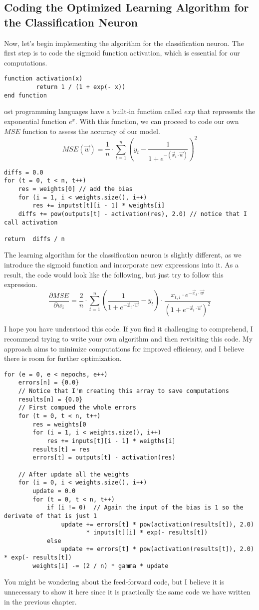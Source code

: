 \subsection{Coding the Optimized Learning Algorithm for the Classification Neuron}
Now, let's begin implementing the algorithm for the classification neuron. The first step is to code
the sigmoid function activation, which is essential for our computations.
\begin{verbatim}
function activation(x)
         return 1 / (1 + exp(- x))
end function
\end{verbatim}
ost programming languages have a built-in function called $exp$ that represents the exponential function $e^x$.
With this function, we can proceed to code our own $MSE$ function to assess the accuracy of our model.
\[
MSE(\vec{w}) = \frac{1}{n} \cdot \sum_{t = 1}^{n}(y_t - \frac{1}{1 + e^{-(\vec{x}_t \cdot \vec{w})}})^2
\]
\begin{verbatim}
diffs = 0.0
for (t = 0, t < n, t++)
    res = weights[0] // add the bias
    for (i = 1, i < weights.size(), i++)
        res += inputst[t][i - 1] * weights[i]
    diffs += pow(outputs[t] - activation(res), 2.0) // notice that I call activation

return  diffs / n
\end{verbatim}
The learning algorithm for the classification neuron is slightly different, as we introduce the sigmoid
function and incorporate new expressions into it. As a result, the code would look like the following,
but just try to follow this expression.
\[
\frac{\partial MSE}{\partial w_i} = \frac{2}{n} \cdot \sum_{t = 1}^n
(\frac{1}{1 + e^{-\vec{x}_t \cdot \vec{w}}} - y_t) \cdot
\frac{x_{t, i} \cdot e^{- \vec{x}_t \cdot \vec{w}}}{(1 + e^{- \vec{x}_t \cdot \vec{w}})^2}
\]

I hope you have understood this code. If you find it challenging to comprehend, I recommend trying to write
your own algorithm and then revisiting this code. My approach aims to minimize computations for improved
efficiency, and I believe there is room for further optimization.
\begin{verbatim}
for (e = 0, e < nepochs, e++)
    errors[n] = {0.0}
    // Notice that I'm creating this array to save computations
    results[n] = {0.0}
    // First compued the whole errors
    for (t = 0, t < n, t++)
        res = weights[0
        for (i = 1, i < weights.size(), i++)
            res += inputs[t][i - 1] * weigths[i]
        results[t] = res
        errors[t] = outputs[t] - activation(res)

    // After update all the weights
    for (i = 0, i < weights.size(), i++)
        update = 0.0
        for (t = 0, t < n, t++)
            if (i != 0)  // Again the input of the bias is 1 so the derivate of that is just 1
                update += errors[t] * pow(activation(results[t]), 2.0)
                       * inputs[t][i] * exp(- results[t])
            else
                update += errors[t] * pow(activation(results[t]), 2.0) * exp(- results[t])
        weights[i] -= (2 / n) * gamma * update
\end{verbatim}
You might be wondering about the feed-forward code, but I believe it is unnecessary to
show it here since it is practically the same code we have written in the previous chapter.
